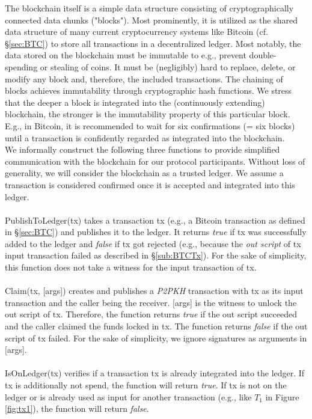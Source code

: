 \documentclass{cacthesis}
\newcounter{protocol}
\begin{document}
        The blockchain itself is a simple data structure consisting of cryptographically connected data chunks ("blocks"). Most prominently, it is utilized as the shared data structure of many current cryptocurrency systems like Bitcoin (cf. §\ref{sec:BTC}) to store all transactions in a decentralized ledger. Most notably, the data stored on the blockchain must be immutable to e.g., prevent double-spending or stealing of coins. It must be (negligibly) hard to replace, delete, or modify any block and, therefore, the included transactions. The chaining of blocks achieves immutability through cryptographic hash functions. We stress that the deeper a block is integrated into the (continuously extending) blockchain, the stronger is the immutability property of this particular block. E.g., in Bitcoin, it is recommended to wait for six confirmations (= six blocks) until a transaction is confidently regarded as integrated into the blockchain. \\
        We informally construct the following three functions to provide simplified communication with the blockchain for our protocol participants. Without loss of generality, we will consider the blockchain as a trusted ledger. We assume a transaction is considered confirmed once it is accepted and integrated into this ledger. \\\\ 
        \textsf{PublishToLedger(tx)} takes a transaction \textsf{tx} (e.g., a Bitcoin transaction as defined in §\ref{sec:BTC}) and publishes it to the ledger. It returns \textit{true} if \textsf{tx} was successfully added to the ledger and \textit{false} if \textsf{tx} got rejected (e.g., because the \textit{out script} of \textsf{tx} input transaction failed as described in §\ref{sub:BTCTx}). For the sake of simplicity, this function does not take a witness for the input transaction of  \textsf{tx}. \\\\ 
        \textsf{Claim(tx, [args])} creates and publishes a \textit{P2PKH} transaction with \textsf{tx} as its input transaction and the caller being the receiver. \textsf{[args]} is the witness to unlock the out script of \textsf{tx}. Therefore, the function returns \textit{true} if the out script succeeded and the caller claimed the funds locked in \textsf{tx}. The function returns \textit{false} if the out script of \textsf{tx} failed. For the sake of simplicity, we ignore signatures as arguments in \textsf{[args]}.\\\\ 
        \textsf{IsOnLedger(tx)} verifies if a transaction \textsf{tx} is already integrated into the ledger. If \textsf{tx} is additionally not spend, the function will return \textit{true}. If \textsf{tx} is not on the ledger or is already used as input for another transaction (e.g., like $T_1$ in Figure \ref{fig:tx1}), the function will return \textit{false}.
        
\end{document}
